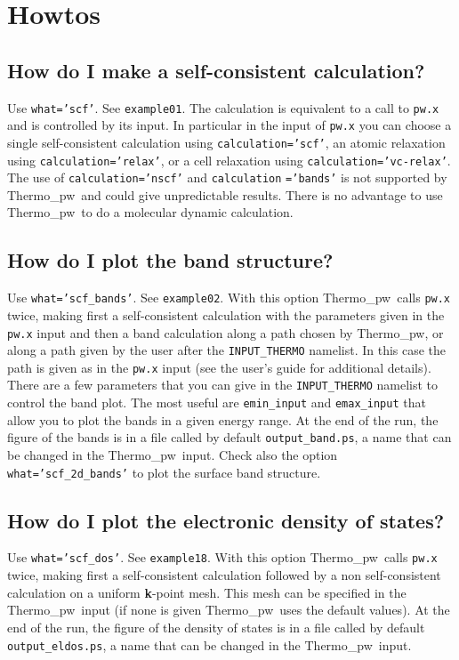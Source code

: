 \documentclass[12pt,a4paper,twoside]{report}
\def\thermo{{\sc Thermo}\_{\sc pw}}
\begin{document}
\newpage
{\color{dark-blue}\chapter{Howtos}}

{\color{coral}\section{How do I make a self-consistent calculation?}}
\color{black}
Use \texttt{what='scf'}. See \texttt{example01}. The calculation is
equivalent to a call to \texttt{pw.x} and is controlled by
its input. In particular in the input of \texttt{pw.x} you can choose
a single self-consistent calculation using \texttt{calculation='scf'}, 
an atomic relaxation using \texttt{calculation='relax'}, or a cell relaxation 
using \texttt{calculation='vc-relax'}.
The use of \texttt{calculation='nscf'} and \texttt{calculation}
\texttt{='bands'} is
not supported by \thermo\ and could give unpredictable results.
There is no advantage to use \thermo\ to do a molecular dynamic
calculation. 

\newpage

{\color{coral}\section{How do I plot the band structure?}}
\color{black}
Use \texttt{what='scf\_bands'}. See \texttt{example02}.
With this option \thermo\ calls 
\texttt{pw.x} twice, making first a self-consistent calculation with 
the parameters
given in the \texttt{pw.x} input and then a band calculation along a 
path chosen by \thermo, or along a path given by the user
after the \texttt{INPUT\_THERMO} namelist. In this case the path is given as
in the \texttt{pw.x} input (see the user's guide for additional details).
There are a few parameters that you can give in the \texttt{INPUT\_THERMO} namelist to control the band plot. The most useful are 
\texttt{emin\_input} and \texttt{emax\_input} that allow you to plot the 
bands in a given energy range. At the end of the run, the figure of 
the bands is in a file called by default \texttt{output\_band.ps}, a name
that can be changed in the \thermo\ input.
Check also the option \texttt{what='scf\_2d\_bands'} 
to plot the surface band structure.
\newpage

{\color{coral}\section{How do I plot the electronic density of states?}}
\color{black}
Use \texttt{what='scf\_dos'}. See \texttt{example18}. With this option
\thermo\ calls \texttt{pw.x} twice, making first a self-consistent calculation
followed by a non self-consistent calculation on a uniform {\bf k}-point mesh.
This mesh can be specified in the \thermo\ input (if none is given \thermo\ 
uses the default values). At the end of the run, the figure of the density of
states is in a file called by default \texttt{output\_eldos.ps}, a name
that can be changed in the \thermo\ input.
\newpage
\end{document}
